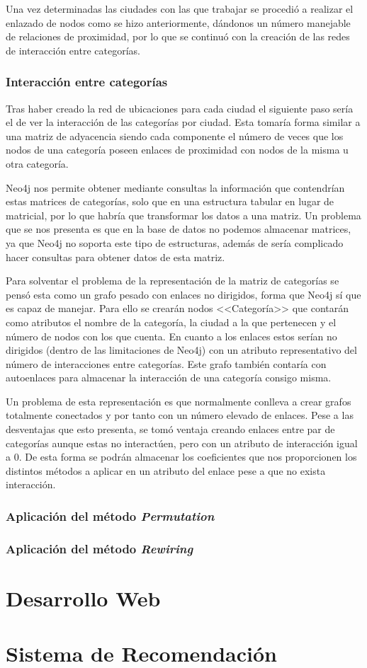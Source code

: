 Una vez determinadas las ciudades con las que trabajar se procedió a realizar el enlazado de nodos como se hizo anteriormente, dándonos un número manejable de relaciones de proximidad, por lo que se continuó con la creación de las redes de interacción entre categorías.

\subsubsection{Interacción entre categorías}

Tras haber creado la red de ubicaciones para cada ciudad el siguiente paso sería el de ver la interacción de las categorías por ciudad. Esta tomaría forma similar a una matriz de adyacencia siendo cada componente el número de veces que los nodos de una categoría poseen enlaces de proximidad con nodos de la misma u otra categoría.

Neo4j nos permite obtener mediante consultas la información que contendrían estas matrices de categorías, solo que en una estructura tabular en lugar de matricial, por lo que habría que transformar los datos a una matriz. Un problema que se nos presenta es que en la base de datos no podemos almacenar matrices, ya que Neo4j no soporta este tipo de estructuras, además de sería complicado hacer consultas para obtener datos de esta matriz.

Para solventar el problema de la representación de la matriz de categorías se pensó esta como un grafo pesado con enlaces no dirigidos, forma que Neo4j sí que es capaz de manejar. Para ello se crearán nodos <<Categoría>> que contarán como atributos el nombre de la categoría, la ciudad a la que pertenecen y el número de nodos con los que cuenta. En cuanto a los enlaces estos serían no dirigidos (dentro de las limitaciones de Neo4j) con un atributo representativo del número de interacciones entre categorías. Este grafo también contaría con autoenlaces para almacenar la interacción de una categoría consigo misma. 

Un problema de esta representación es que normalmente conlleva a crear grafos totalmente conectados y por tanto con un número elevado de enlaces. Pese a las desventajas que esto presenta, se tomó ventaja creando enlaces entre par de categorías aunque estas no interactúen, pero con un atributo de interacción igual a 0. De esta forma se podrán almacenar los coeficientes que nos proporcionen los distintos métodos a aplicar en un atributo del enlace pese a que no exista interacción.

\subsubsection{Aplicación del método \textit{Permutation}}

\subsubsection{Aplicación del método \textit{Rewiring}}

\section{Desarrollo Web}


\section{Sistema de Recomendación}